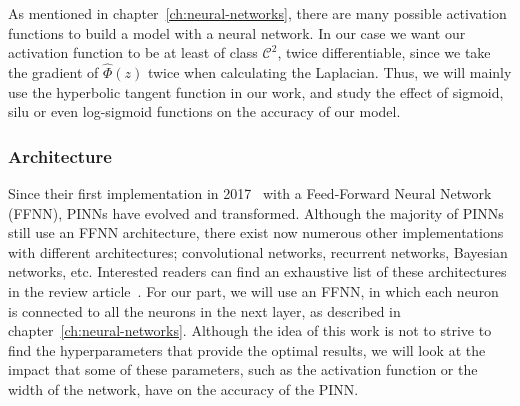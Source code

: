 As mentioned in chapter~\ref{ch:neural-networks}, there are many possible activation functions to build a model with a neural network. In our case we want our activation function to be at least of class $\mathcal{C}^2$, twice differentiable, since we take the gradient of $\hat{\Phi}(z)$ twice when calculating the Laplacian. Thus, we will mainly use the hyperbolic tangent function in our work, and study the effect of sigmoid, silu or even log-sigmoid functions on the accuracy of our model.



\subsubsection{Architecture}

Since their first implementation in 2017~\cite{raissi_physics_2017} with a Feed-Forward Neural Network (FFNN), PINNs have evolved and transformed. Although the majority of PINNs still use an FFNN architecture, there exist now numerous other implementations with different architectures; convolutional networks, recurrent networks, Bayesian networks, etc. Interested readers can find an exhaustive list of these architectures in the review article~\cite{cuomo_scientific_2022}. For our part, we will use an FFNN, in which each neuron is connected to all the neurons in the next layer, as described in chapter~\ref{ch:neural-networks}. Although the idea of this work is not to strive to find the hyperparameters that provide the optimal results, we will look at the impact that some of these parameters, such as the activation function or the width of the network, have on the accuracy of the PINN.
